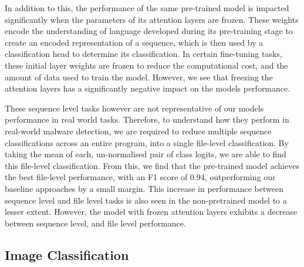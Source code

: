 \documentclass[conference,compsoc]{IEEEtran}
\begin{document}
In addition to this, the performance of the same pre-trained model is impacted significantly when the parameters of its attention layers are frozen. These weights encode the understanding of language developed during its pre-training stage to create an encoded representation of a sequence, which is then used by a classification head to determine its classification. In certain fine-tuning tasks, these initial layer weights are frozen to reduce the computational cost, and the amount of data used to train the model. However, we see that freezing the attention layers has a significantly negative impact on the models performance. 

These sequence level tasks however are not representative of our models performance in real world tasks. Therefore, to understand how they perform in real-world malware detection, we are required to reduce multiple sequence classifications across an entire program, into a single file-level classification. By taking the mean of each, un-normalised pair of class logits, we are able to find this file-level classification. From this, we find that the pre-trained model achieves the best file-level performance, with an F1 score of 0.94, outperforming our baseline approaches by a small margin. This increase in performance between sequence level and file level tasks is also seen in the non-pretrained model to a lesser extent. However, the model with frozen attention layers exhibits a decrease between sequence level, and file level performance.


\subsection{Image Classification}

\end{document}
